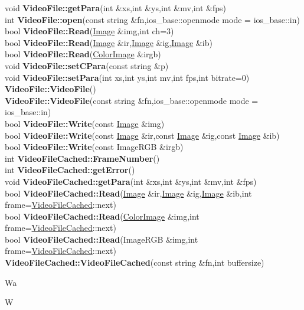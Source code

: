 \documentclass[10pt,titlepage]{article}
\def\functionlistentry#1#2#3#4#5#6{\noindent #1 {\bf #2}(#3) \dotfill #6\\}
\def\letterref#1{}
\def\letterlabel#1{\vspace{0.5cm}\centerline{\Large #1}}
\def\letterlabelend#1{}
\begin{document}
{{\letterref{Ve}
\letterref{Vi}
\letterlabelend{Vi}
\functionlistentry{void}{VideoFile::getPara}{int \&xs,int \&ys,int \&mv,int \&fps}{122}{imageio}{}
\functionlistentry{int}{VideoFile::open}{const string \&fn,ios\_base::openmode mode = ios\_base::in}{121}{imageio}{}
\functionlistentry{bool}{VideoFile::Read}{\hyperlink{Image}{Image} \&img,int ch=3}{125}{imageio}{}
\functionlistentry{bool}{VideoFile::Read}{\hyperlink{Image}{Image} \&ir,\hyperlink{Image}{Image} \&ig,\hyperlink{Image}{Image} \&ib}{126}{imageio}{}
\functionlistentry{bool}{VideoFile::Read}{\hyperlink{ColorImage}{ColorImage} \&irgb}{127}{imageio}{}
\functionlistentry{void}{VideoFile::setCPara}{const string \&p}{124}{imageio}{}
\functionlistentry{void}{VideoFile::setPara}{int xs,int ys,int mv,int fps,int bitrate=0}{123}{imageio}{}
\functionlistentry{}{VideoFile::VideoFile}{}{119}{imageio}{}
\functionlistentry{}{VideoFile::VideoFile}{const string \&fn,ios\_base::openmode mode = ios\_base::in}{120}{imageio}{}
\functionlistentry{bool}{VideoFile::Write}{const \hyperlink{Image}{Image} \&img}{128}{imageio}{}
\functionlistentry{bool}{VideoFile::Write}{const \hyperlink{Image}{Image} \&ir,const \hyperlink{Image}{Image} \&ig,const \hyperlink{Image}{Image} \&ib}{129}{imageio}{}
\functionlistentry{bool}{VideoFile::Write}{const ImageRGB \&irgb}{130}{imageio}{}
\functionlistentry{int}{VideoFileCached::FrameNumber}{}{145}{imageio}{}
\functionlistentry{int}{VideoFileCached::getError}{}{146}{imageio}{}
\functionlistentry{void}{VideoFileCached::getPara}{int \&xs,int \&ys,int \&mv,int \&fps}{141}{imageio}{}
\functionlistentry{bool}{VideoFileCached::Read}{\hyperlink{Image}{Image} \&ir,\hyperlink{Image}{Image} \&ig,\hyperlink{Image}{Image} \&ib,int frame=\hyperlink{VideoFileCached}{VideoFileCached}::next}{142}{imageio}{}
\functionlistentry{bool}{VideoFileCached::Read}{\hyperlink{ColorImage}{ColorImage} \&img,int frame=\hyperlink{VideoFileCached}{VideoFileCached}::next}{143}{imageio}{}
\functionlistentry{bool}{VideoFileCached::Read}{ImageRGB \&img,int frame=\hyperlink{VideoFileCached}{VideoFileCached}::next}{144}{imageio}{}
\functionlistentry{}{VideoFileCached::VideoFileCached}{const string \&fn,int buffersize}{140}{imageio}{}

\letterlabel{Wa}
\letterlabel{W}
\letterref{A}
\letterref{B}
\letterref{C}
\letterref{D}
\letterref{E}
\letterref{F}
\letterref{G}
\letterref{H}
\letterref{I}
\letterref{K}
\letterref{L}
\letterref{M}
\letterref{N}
\letterref{O}
\letterref{P}
\letterref{Q}
\letterref{R}
\letterref{S}
\letterref{T}
\letterref{U}
\letterref{V}
\letterref{W}
\letterref{X}
\letterref{Y}
\letterref{Z}

}}
\end{document}
